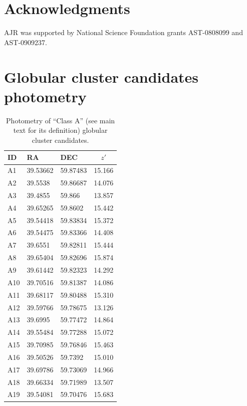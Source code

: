 \documentclass[useAMS,usenatbib]{mn2e}
\begin{document}

\section*{Acknowledgments}

AJR was supported by National Science Foundation grants AST-0808099
and AST-0909237.




\appendix
\section{Globular cluster candidates photometry}
\label{sec:appendix}
\begin{table}
 \centering
 \caption{Photometry of ``Class A'' (see main text for its definition) globular cluster candidates.}
\label{tab:class_a}  
\begin{tabular}{lllc}
	\hline
	ID & RA & DEC & $z'$ \\
	\hline
	A1 & 39.53662 & 59.87483 & 15.166 \\
	A2 & 39.5538 & 59.86687 & 14.076 \\
	A3 & 39.4855 & 59.866 & 13.857 \\
	A4 & 39.65265 & 59.8602 & 15.442 \\
	A5 & 39.54418 & 59.83834 & 15.372 \\
	A6 & 39.54475 & 59.83366 & 14.408 \\
	A7 & 39.6551 & 59.82811 & 15.444 \\
	A8 & 39.65404 & 59.82696 & 15.874 \\
	A9 & 39.61442 & 59.82323 & 14.292 \\
	A10 & 39.70516 & 59.81387 & 14.086 \\
	A11 & 39.68117 & 59.80488 & 15.310 \\
	A12 & 39.59766 & 59.78675 & 13.126 \\
	A13 & 39.6995 & 59.77472 & 14.864 \\
	A14 & 39.55484 & 59.77288 & 15.072 \\
	A15 & 39.70985 & 59.76846 & 15.463 \\
	A16 & 39.50526 & 59.7392 & 15.010 \\
	A17 & 39.69786 & 59.73069 & 14.966 \\
	A18 & 39.66334 & 59.71989 & 13.507 \\
	A19 & 39.54081 & 59.70476 & 15.683 \\

\end{tabular}
\end{table}
\end{document}
